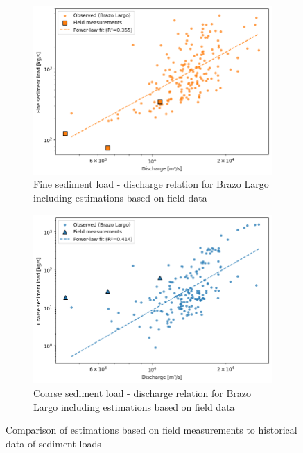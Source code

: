 \begin{figure}[!ht]
    \centering
    \begin{subfigure}[b]{0.48\linewidth}
        \centering        \includegraphics[width=\linewidth]{figures/ch6/fine measurements.png}
        \caption{Fine sediment load - discharge relation for Brazo Largo including estimations based on field data}
        \label{fig:fine measurements}
    \end{subfigure}
    \hfill
    \begin{subfigure}[b]{0.48\linewidth}
        \centering
        \includegraphics[width=\linewidth]{figures/ch6/coarse measurements.png}
        \caption{Coarse sediment load - discharge relation for Brazo Largo including estimations based on field data }
        \label{fig:coarse measurements}
    \end{subfigure}
    
    \caption{Comparison of estimations based on field measurements to historical data of sediment loads}
    \label{fig:correlationmatrices}
\end{figure}

